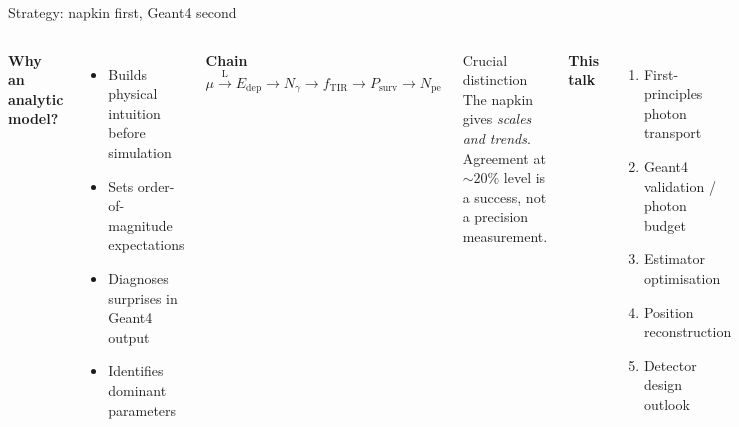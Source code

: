 \documentclass[aspectratio=169,9pt]{beamer}
\begin{document}
\begin{frame}{Strategy: napkin first, Geant4 second}
\begin{columns}[T]
\textbf{Why an analytic model?}
\begin{itemize}
  \item Builds physical intuition before simulation
  \item Sets order-of-magnitude expectations
  \item Diagnoses surprises in Geant4 output
  \item Identifies dominant parameters
\end{itemize}
\vspace{4pt}
\textbf{Chain}
{\footnotesize\[
  \mu \xrightarrow{\mathrm{L}} E_{\mathrm{dep}}
  \to N_\gamma \to f_{\mathrm{TIR}}
  \to P_{\mathrm{surv}} \to N_{\mathrm{pe}}
\]}
\begin{block}{Crucial distinction}
  The napkin gives \emph{scales and trends}.
  Agreement at $\sim20\%$ level is a success,
  not a precision measurement.
\end{block}
\vspace{6pt}
\textbf{This talk}
{\small\begin{enumerate}
  \item First-principles photon transport
  \item Geant4 validation / photon budget
  \item Estimator optimisation
  \item Position reconstruction
  \item Detector design outlook
\end{enumerate}}
\end{columns}
\end{frame}
\end{document}
